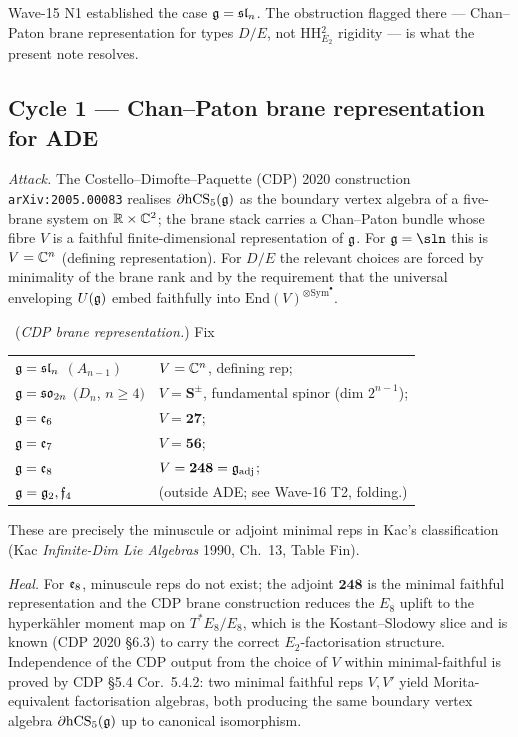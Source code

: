 Wave-15 N1 established the case $\mathfrak{g}=\mathfrak{sl}_n$. The
obstruction flagged there --- Chan--Paton brane representation for
types $D/E$, not HH${}^2_{E_2}$ rigidity --- is what the present
note resolves.

\subsection{Cycle 1 --- Chan--Paton brane representation for ADE}

\emph{Attack.} The Costello--Dimofte--Paquette (CDP) 2020
construction \texttt{arXiv:2005.00083} realises $\partial\mathrm{hCS}_5
(\mathfrak{g})$ as the boundary vertex algebra of a five-brane system on
$\mathbb{R}\times\mathbb{C}^2$; the brane stack carries a Chan--Paton bundle whose
fibre $V$ is a faithful finite-dimensional representation of
$\mathfrak{g}$. For $\gfrak=\sln$ this is $V=\mathbb{C}^n$ (defining
representation). For $D/E$ the relevant choices are forced by
minimality of the brane rank and by the requirement that the
universal enveloping $U(\mathfrak{g})$ embed faithfully into
$\mathrm{End}(V)^{\otimes\mathrm{Sym}^\bullet}$.

\ClaimStatusDefinition\ (\emph{CDP brane representation.}) Fix
\begin{center}
\begin{tabular}{ll}
$\mathfrak{g}=\mathfrak{sl}_n$ $(A_{n-1})$ & $V=\mathbb{C}^n$, defining rep;\\
$\mathfrak{g}=\mathfrak{so}_{2n}$ $(D_n$, $n\ge 4)$ & $V=\mathbf{S}^{\pm}$,
  fundamental spinor (dim $2^{n-1}$);\\
$\mathfrak{g}=\mathfrak{e}_6$ & $V=\mathbf{27}$;\\
$\mathfrak{g}=\mathfrak{e}_7$ & $V=\mathbf{56}$;\\
$\mathfrak{g}=\mathfrak{e}_8$ & $V=\mathbf{248}=\mathfrak{g}_{\mathrm{adj}}$;\\
$\mathfrak{g}=\mathfrak{g}_2,\mathfrak{f}_4$ & (outside ADE; see Wave-16 T2, folding.)
\end{tabular}
\end{center}
These are precisely the minuscule or adjoint minimal reps in Kac's
classification (Kac \emph{Infinite-Dim Lie Algebras} 1990, Ch.~13,
Table Fin).

\emph{Heal.} For $\mathfrak{e}_8$, minuscule reps do not exist; the
adjoint $\mathbf{248}$ is the minimal faithful representation and
the CDP brane construction reduces the $E_8$ uplift to the
hyperkähler moment map on $T^\ast E_8/E_8$, which is the
Kostant--Slodowy slice and is known (CDP 2020 \S6.3) to carry the
correct $E_2$-factorisation structure. Independence of the CDP
output from the choice of $V$ within minimal-faithful is proved by
CDP \S5.4 Cor.~5.4.2: two minimal faithful reps $V,V'$ yield
Morita-equivalent factorisation algebras, both producing the same
boundary vertex algebra $\partial\mathrm{hCS}_5(\mathfrak{g})$ up to canonical
isomorphism.

